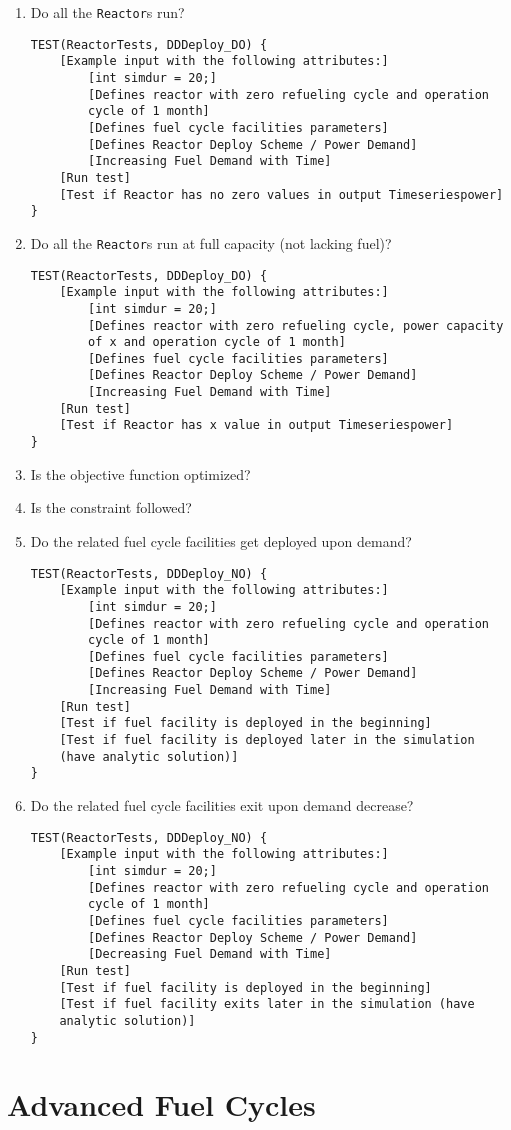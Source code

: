 \documentclass[12pt,letterpaper]{article}
\begin{document}
\begin{enumerate}
\item Do all the \texttt{Reactor}s run? 
\begin{verbatim}
TEST(ReactorTests, DDDeploy_DO) {
    [Example input with the following attributes:]
        [int simdur = 20;]
        [Defines reactor with zero refueling cycle and operation 
        cycle of 1 month]
        [Defines fuel cycle facilities parameters]
        [Defines Reactor Deploy Scheme / Power Demand]
        [Increasing Fuel Demand with Time]
    [Run test]
    [Test if Reactor has no zero values in output Timeseriespower]
}
\end{verbatim}
\item  Do all the \texttt{Reactor}s run at full capacity (not lacking fuel)? 
\begin{verbatim}
TEST(ReactorTests, DDDeploy_DO) {
    [Example input with the following attributes:]
        [int simdur = 20;]
        [Defines reactor with zero refueling cycle, power capacity 
        of x and operation cycle of 1 month]
        [Defines fuel cycle facilities parameters]
        [Defines Reactor Deploy Scheme / Power Demand]
        [Increasing Fuel Demand with Time]
    [Run test]
    [Test if Reactor has x value in output Timeseriespower]
}
\end{verbatim}

\item Is the objective function optimized?

\item Is the constraint followed? 

\item  Do the related fuel cycle facilities get deployed upon demand?
\begin{verbatim}
TEST(ReactorTests, DDDeploy_NO) {
    [Example input with the following attributes:]
        [int simdur = 20;]
        [Defines reactor with zero refueling cycle and operation 
        cycle of 1 month]
        [Defines fuel cycle facilities parameters]
        [Defines Reactor Deploy Scheme / Power Demand]
        [Increasing Fuel Demand with Time]
    [Run test]
    [Test if fuel facility is deployed in the beginning]
    [Test if fuel facility is deployed later in the simulation 
    (have analytic solution)]
}
\end{verbatim}

\item Do the related fuel cycle facilities exit upon demand decrease?
\begin{verbatim}
TEST(ReactorTests, DDDeploy_NO) {
    [Example input with the following attributes:]
        [int simdur = 20;]
        [Defines reactor with zero refueling cycle and operation 
        cycle of 1 month]
        [Defines fuel cycle facilities parameters]
        [Defines Reactor Deploy Scheme / Power Demand]
        [Decreasing Fuel Demand with Time]
    [Run test]
    [Test if fuel facility is deployed in the beginning]
    [Test if fuel facility exits later in the simulation (have 
    analytic solution)]
}
\end{verbatim}


\end{enumerate}





\section{Advanced Fuel Cycles}
\end{document}
